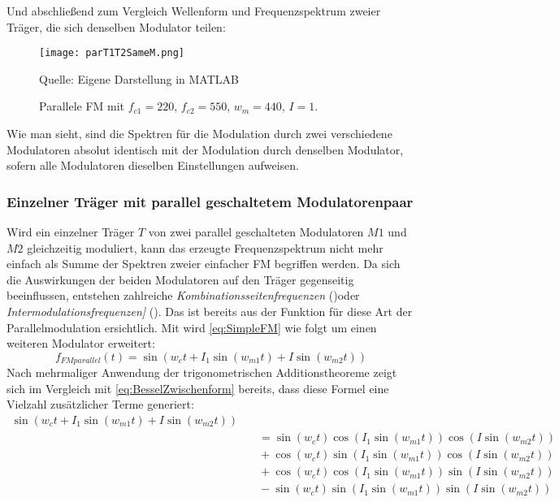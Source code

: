 \FloatBarrier
Und abschließend zum Vergleich Wellenform und Frequenzspektrum zweier Träger, die sich denselben Modulator teilen:
\FloatBarrier
\begin{figure} [ht]
\centering
  \texttt{[image: parT1T2SameM.png]}
\caption{Parallele FM mit $f_{c1} = 220$, $f_{c2} = 550$, $w_{m} = 440$, $I = 1$.  }
Quelle: Eigene Darstellung in MATLAB
\end{figure}
\FloatBarrier
Wie man sieht, sind die Spektren für die Modulation durch zwei verschiedene Modulatoren absolut identisch mit der Modulation durch denselben Modulator, sofern alle Modulatoren dieselben Einstellungen aufweisen.

\subsubsection{Einzelner Träger mit parallel geschaltetem Modulatorenpaar}
\label{singlecarryparallelmod}
Wird ein einzelner Träger $T$ von zwei parallel geschalteten Modulatoren $M1$ und $M2$ gleichzeitig moduliert, kann das erzeugte Frequenzspektrum nicht mehr einfach als Summe der Spektren zweier einfacher FM begriffen werden. Da sich die Auswirkungen der beiden Modulatoren auf den Träger gegenseitig beeinflussen, entstehen zahlreiche \textit{Kombinationsseitenfrequenzen} (\cite[S.117]{fmtheory})oder \textit{Intermodulationsfrequenzen]} (\cite{schottiWeb}). Das ist bereits aus der Funktion für diese Art der Parallelmodulation ersichtlich. Mit \cite[S.46]{schottstaedt} wird \ref{eq:SimpleFM} wie folgt um einen weiteren Modulator erweitert:
\begin{equation}
f_{FMparallel}(t) = \sin(w_ct + I_1\sin(w_{m1}t) + I\sin(w_{m2}t))
\end{equation}
Nach mehrmaliger Anwendung der trigonometrischen Additionstheoreme zeigt sich im Vergleich mit \ref{eq:BesselZwischenform} bereits, dass diese Formel eine Vielzahl zusätzlicher Terme generiert:
\begin{equation}
\begin{split}
\sin(w_ct + I_1\sin(w_{m1}t) + I\sin(w_{m2}t)) \\ &\quad = \sin(w_ct)\cos(I_1\sin(w_{m1}t))\cos(I\sin(w_{m2}t)) \\ &\quad + \cos(w_ct)\sin(I_1\sin(w_{m1}t))\cos(I\sin(w_{m2}t)) \\ &\quad +\cos(w_ct)\cos(I_1\sin(w_{m1}t))\sin(I\sin(w_{m2}t)) \\ &\quad -\sin(w_ct)\sin(I_1\sin(w_{m1}t))\sin(I\sin(w_{m2}t))
\end{split}
\end{equation}
